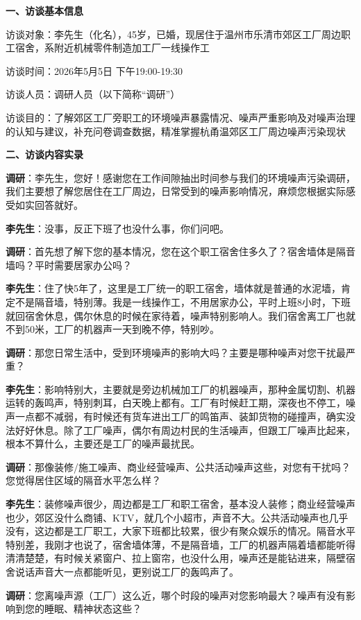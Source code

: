\begin{appendices}
\textbf{一、访谈基本信息}

访谈对象：李先生（化名），45岁，已婚，现居住于温州市乐清市郊区工厂周边职工宿舍，系附近机械零件制造加工厂一线操作工

访谈时间：2026年5月5日 下午19:00-19:30

访谈人员：调研人员（以下简称“调研”）

访谈目的：了解郊区工厂旁职工的环境噪声暴露情况、噪声严重影响及对噪声治理的认知与建议，补充问卷调查数据，精准掌握杭甬温郊区工厂周边噪声污染现状

\textbf{二、访谈内容实录}

\textbf{调研}：李先生，您好！感谢您在工作间隙抽出时间参与我们的环境噪声污染调研，我们主要想了解您居住在工厂周边，日常受到的噪声影响情况，麻烦您根据实际感受如实回答就好。

\textbf{李先生}：没事，反正下班了也没什么事，你们问吧。

\textbf{调研}：首先想了解下您的基本情况，您在这个职工宿舍住多久了？宿舍墙体是隔音墙吗？平时需要居家办公吗？

\textbf{李先生}：住了快5年了，这里是工厂统一的职工宿舍，墙体就是普通的水泥墙，肯定不是隔音墙，特别薄。我是一线操作工，不用居家办公，平时上班8小时，下班就回宿舍休息，偶尔休息的时候在家待着，噪声特别影响人。我们宿舍离工厂也就不到50米，工厂的机器声一天到晚不停，特别吵。

\textbf{调研}：那您日常生活中，受到环境噪声的影响大吗？主要是哪种噪声对您干扰最严重？

\textbf{李先生}：影响特别大，主要就是旁边机械加工厂的机器噪声，那种金属切割、机器运转的轰鸣声，特别刺耳，白天晚上都有。工厂有时候赶工期，深夜也不停工，噪声一点都不减弱，有时候还有货车进出工厂的鸣笛声、装卸货物的碰撞声，确实没法好好休息。除了工厂噪声，偶尔有周边村民的生活噪声，但跟工厂噪声比起来，根本不算什么，主要还是工厂的噪声最扰民。

\textbf{调研}：那像装修/施工噪声、商业经营噪声、公共活动噪声这些，对您有干扰吗？您觉得居住区域的隔音水平怎么样？

\textbf{李先生}：装修噪声很少，周边都是工厂和职工宿舍，基本没人装修；商业经营噪声也少，郊区没什么商铺、KTV，就几个小超市，声音不大。公共活动噪声也几乎没有，这边都是工厂职工，大家下班都比较累，很少有聚众娱乐的情况。隔音水平特别差，我刚才也说了，宿舍墙体薄，不是隔音墙，工厂的机器声隔着墙都能听得清清楚楚，有时候关紧窗户、拉上窗帘，也没什么用，噪声还是能钻进来，隔壁宿舍说话声音大一点都能听见，更别说工厂的轰鸣声了。

\textbf{调研}：您离噪声源（工厂）这么近，哪个时段的噪声对您影响最大？噪声有没有影响到您的睡眠、精神状态这些？


\end{appendices}
